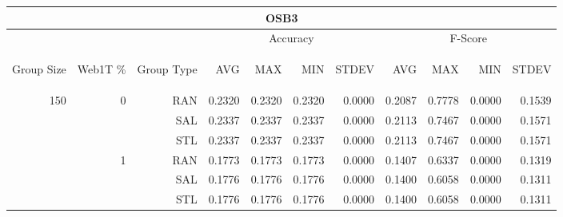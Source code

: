 \begin{center}
\begin{table}[htbp]
\begin{tabular}{ | r | r | r | r | r | r | r | r | r | r | r |}
\hline
\multicolumn{11}{|c|}{OSB3}\\
\hline
 & & & \multicolumn{4}{|c|}{Accuracy} & \multicolumn{4}{|c|}{F-Score}\\ \cline{4-11}
\begin{sideways}Group Size\end{sideways} & \begin{sideways}Web1T \%\end{sideways} & \begin{sideways}Group Type\end{sideways} & \begin{sideways}AVG\end{sideways} & \begin{sideways}MAX\end{sideways} & \begin{sideways}MIN\end{sideways} & \begin{sideways}STDEV\end{sideways} & \begin{sideways}AVG\end{sideways} & \begin{sideways}MAX\end{sideways} & \begin{sideways}MIN\end{sideways} & \begin{sideways}STDEV\end{sideways}\\
\hline
\multirow{18}{*}{150}
 & \multirow{3}{*}{0} & RAN & 0.2320 & 0.2320 & 0.2320 & 0.0000 & 0.2087 & 0.7778 & 0.0000 & 0.1539\\ \cline{3-11}
 &   & SAL & 0.2337 & 0.2337 & 0.2337 & 0.0000 & 0.2113 & 0.7467 & 0.0000 & 0.1571\\ \cline{3-11}
 &   & STL & 0.2337 & 0.2337 & 0.2337 & 0.0000 & 0.2113 & 0.7467 & 0.0000 & 0.1571\\ \cline{2-11}
 & \multirow{3}{*}{1} & RAN & 0.1773 & 0.1773 & 0.1773 & 0.0000 & 0.1407 & 0.6337 & 0.0000 & 0.1319\\ \cline{3-11}
 &   & SAL & 0.1776 & 0.1776 & 0.1776 & 0.0000 & 0.1400 & 0.6058 & 0.0000 & 0.1311\\ \cline{3-11}
 &   & STL & 0.1776 & 0.1776 & 0.1776 & 0.0000 & 0.1400 & 0.6058 & 0.0000 & 0.1311\\ \cline{2-11}

\end{tabular}
\end{table}
\end{center}
